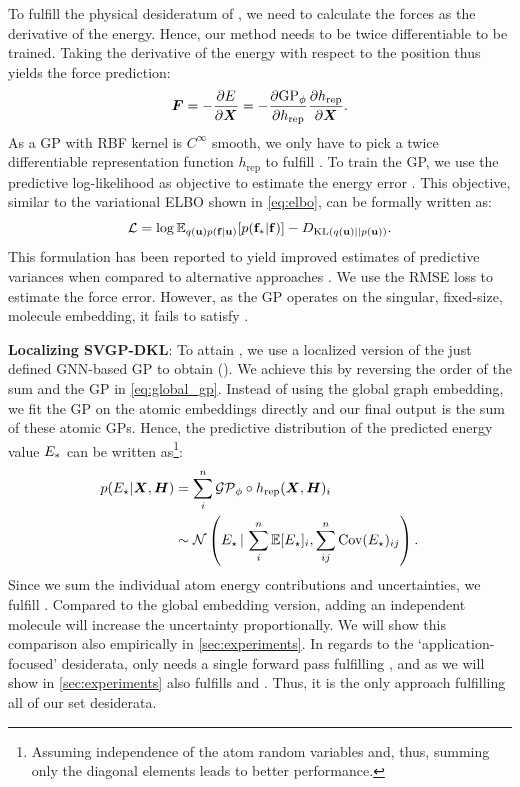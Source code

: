 To fulfill the physical desideratum of \destwo{}, we need to calculate the forces as the derivative of the energy. Hence, our method needs to be twice differentiable to be trained. Taking the derivative of the energy with respect to the position thus yields the force prediction: 
\begin{equation}
\bm{F} = -\frac{\partial E}{\partial \bm{X}} = -\frac{\partial \text{GP}_\phi}{\partial h_{\text{rep}}}\frac{\partial h_{\text{rep}}}{\partial \bm{X}}. 
\end{equation}
As a GP with RBF kernel is $C^\infty$ smooth, we only have to pick a twice differentiable representation function $h_{\text{rep}}$ to fulfill \destwo{}. 
To train the GP, we use the predictive log-likelihood as objective to estimate the energy error \cite{jankowiak_parametric_2020}. This objective, similar to the variational ELBO shown in \autoref{eq:elbo}, can be formally written as: 
\begin{equation}
    \mathcal{L} = \log \mathbb{E}_{q(\mathbf{u})p(\mathbf{f}|\mathbf{u})}[p(\mathbf{f}_*|\mathbf{f})] - D_{\text{KL}(q(\mathbf{u})||p(\mathbf{u}))}.
\end{equation}
This formulation has been reported to yield improved estimates of predictive variances when compared to alternative approaches \cite{jankowiak_parametric_2020, 9982167}. We use the RMSE loss to estimate the force error.
However, as the GP operates on the singular, fixed-size, molecule embedding, it fails to satisfy \desfour{}.

\textbf{Localizing SVGP-DKL}:
To attain \desfour{}, we use a localized version of the just defined GNN-based GP to obtain \ours{} (\oursacro{}). 
We achieve this by reversing the order of the sum and the GP in \autoref{eq:global_gp}.
Instead of using the global graph embedding, we fit the GP on the atomic embeddings directly and our final output is the sum of these atomic GPs. Hence, the predictive distribution of the predicted energy value $E_*$ can be written as\footnote{Assuming independence of the atom random variables and, thus, summing only the diagonal elements leads to better performance.}: 
\begin{align}
    p(E_\star \vert \bm{X}, \bm{H}) &= \sum_i^n \mathcal{GP}_\phi \circ h_{\text{rep}}(\bm{X}, \bm{H})_{i}\\  
    &\sim \mathcal{N}\left(E_\star \,\vert\,\sum_i^n \operatorname{\mathbb{E}} [E_\star]_i, \sum_{ij}^n \mathrm{Cov}(E_\star)_{ij}\right).\nonumber
\end{align}
Since we sum the individual atom energy contributions and uncertainties, we fulfill \desfour{}. Compared to the global embedding version, adding an independent molecule will increase the uncertainty proportionally. We will show this comparison also empirically in \autoref{sec:experiments}.
In regards to the `application-focused' desiderata, \oursacro{} only needs a single forward pass fulfilling \desseven{}, and as we will show in \autoref{sec:experiments} also fulfills \desfive{} and \dessix{}. 
Thus, it is the only approach fulfilling all of our set desiderata.


